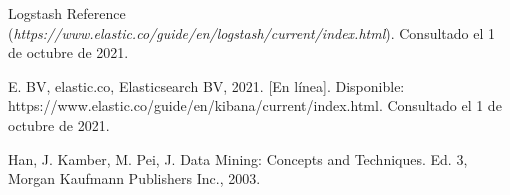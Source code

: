 

\begin{thebibliography}{99}
 Logstash Reference ({\it https://www.elastic.co/guide/en/logstash/current/index.html}). Consultado el 1 de octubre de 2021.

E. BV, elastic.co, Elasticsearch BV, 2021. [En línea]. Disponible:
https://www.elastic.co/guide/en/kibana/current/index.html. Consultado el 1 de octubre de 2021.

Han, J. Kamber, M. Pei, J. Data Mining: Concepts and Techniques. Ed. 3,
Morgan Kaufmann Publishers Inc., 2003.



\end{thebibliography}


